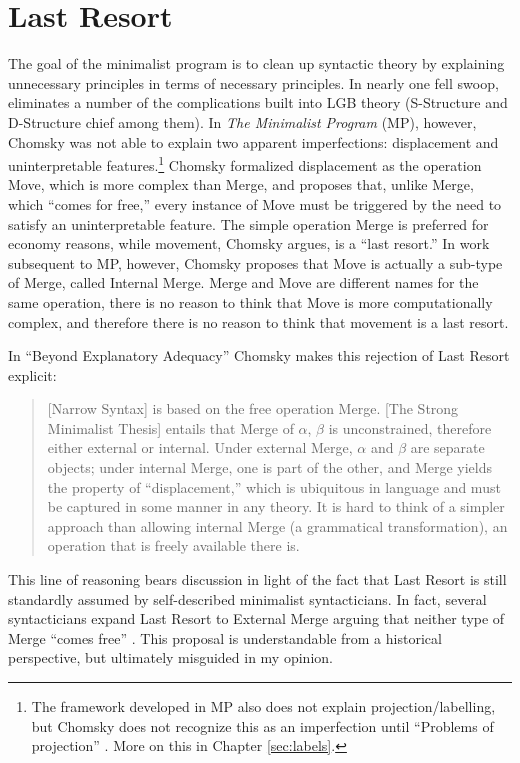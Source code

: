 \section{Last Resort}
The goal of the minimalist program is to clean up syntactic theory by explaining unnecessary principles in terms of necessary principles.
In nearly one fell swoop, \textcite{chomsky1995minimalist} eliminates a number of the complications built into LGB theory (S-Structure and D-Structure chief among them).
In \textit{The Minimalist Program} (MP), however, Chomsky was not able to explain two apparent imperfections: displacement and uninterpretable features.\footnote{
	The framework developed in MP also does not explain projection/labelling, but Chomsky does not recognize this as an imperfection until ``Problems of projection'' \parencite{chomsky2013problems}.
	More on this in Chapter \ref{sec:labels}.
}
Chomsky formalized displacement as the operation Move, which is more complex than Merge, and proposes that, unlike Merge, which ``comes for free,'' every instance of Move must be triggered by the need to satisfy an uninterpretable feature.
The simple operation Merge is preferred for economy reasons, while movement, Chomsky argues, is a ``last resort.''
In work subsequent to MP, however, Chomsky proposes that Move is actually a sub-type of Merge, called Internal Merge.
Merge and Move are different names for the same operation, there is no reason to think that Move is more computationally complex, and therefore there is no reason to think that movement is a last resort.

In ``Beyond Explanatory Adequacy'' \parencite{chomsky2004beyond} Chomsky makes this rejection of Last Resort explicit:
\begin{quote}
	[Narrow Syntax] is based on the free operation Merge.
	[The Strong Minimalist Thesis] entails that Merge of $\alpha$, $\beta$ is unconstrained, therefore either external or internal.
	Under external Merge, $\alpha$ and $\beta$ are separate objects; 
	under internal Merge, one is part of the other, and Merge yields the property of ``displacement,'' which is ubiquitous in language and must be captured in some manner in any theory. 
	It is hard to think of a simpler approach than allowing	internal Merge (a grammatical transformation), an operation that is freely available there is.
	\parencite[110]{chomsky2004beyond}
\end{quote}
This line of reasoning bears discussion in light of the fact that Last Resort is still standardly assumed by self-described minimalist syntacticians.
In fact, several syntacticians expand Last Resort to External Merge arguing that neither type of Merge ``comes free'' \parencite{pesetsky2006probes,frampton2008crash,wurmbrand2014merge,yokoyama2015features}.
This proposal is understandable from a historical perspective, but ultimately misguided in my opinion.

